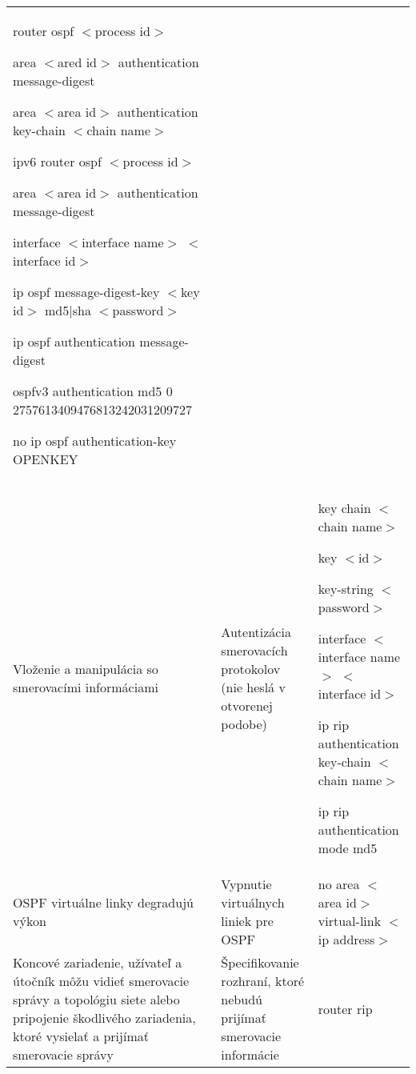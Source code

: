 \begin{longtable}[!htbp]{|L{10em}L{10em}>{\selectfont}L{34em}|}
	router ospf $<$process id$>$
	
	\hspace{0.5em}area $<$ared id$>$ authentication message-digest
	
	\hspace{0.5em}area $<$area id$>$ authentication key-chain $<$chain name$>$
	
	ipv6 router ospf $<$process id$>$
	
	\hspace{0.5em}area $<$area id$>$ authentication message-digest
	
	interface $<$interface name$>$ $<$interface id$>$
	
	\hspace{0.5em}ip ospf message-digest-key $<$key id$>$ md5|sha $<$password$>$
	
	\hspace{0.5em}ip ospf authentication message-digest
	
	\hspace{0.5em}ospfv3 authentication md5 0 2757613409476813242031209727
	
	\hspace{0.5em}no ip ospf authentication-key OPENKEY\\
	
	
	
	
	 Vloženie a manipulácia so smerovacími informáciami	&Autentizácia smerovacích protokolov (nie heslá v otvorenej podobe)	&key chain $<$chain name$>$
	
	\hspace{0.5em}key $<$id$>$
	
	\hspace{1em}key-string $<$password$>$
	
	interface $<$interface name$>$ $<$interface id$>$
	
	\hspace{0.5em}ip rip authentication key-chain $<$chain name$>$
	
	\hspace{0.5em}ip rip authentication mode md5\\
	
	
	
	
	OSPF virtuálne linky degradujú výkon	&Vypnutie virtuálnych liniek pre OSPF	&no area $<$area id$>$ virtual-link $<$ip address$>$\\
	
	
	
	 Koncové zariadenie, užívateľ a útočník môžu vidieť smerovacie správy a topológiu siete alebo pripojenie škodlivého zariadenia, ktoré vysielať a prijímať smerovacie správy	&Špecifikovanie rozhraní, ktoré nebudú prijímať smerovacie informácie	&router rip
	

\end{longtable}

